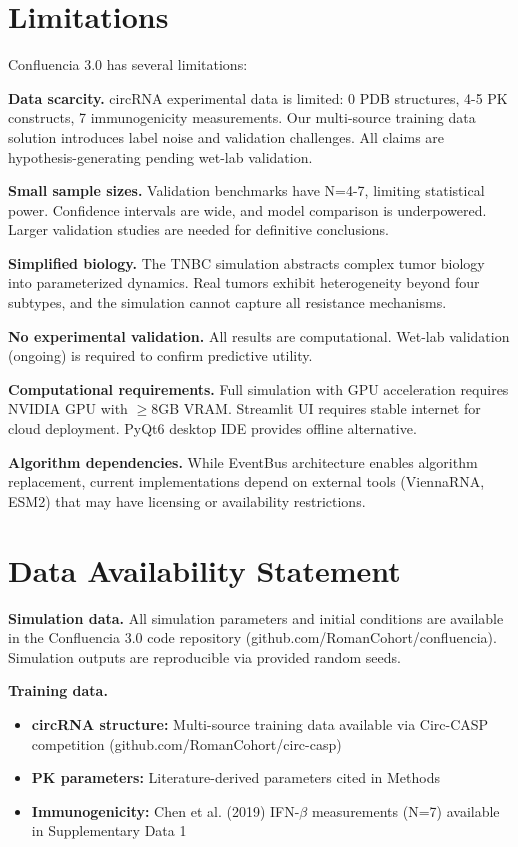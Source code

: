 \documentclass[12pt]{article}
\begin{document}
\section{Limitations}

Confluencia 3.0 has several limitations:

\textbf{Data scarcity.} circRNA experimental data is limited: 0 PDB structures, 4-5 PK constructs, 7 immunogenicity measurements. Our multi-source training data solution introduces label noise and validation challenges. All claims are hypothesis-generating pending wet-lab validation.

\textbf{Small sample sizes.} Validation benchmarks have N=4-7, limiting statistical power. Confidence intervals are wide, and model comparison is underpowered. Larger validation studies are needed for definitive conclusions.

\textbf{Simplified biology.} The TNBC simulation abstracts complex tumor biology into parameterized dynamics. Real tumors exhibit heterogeneity beyond four subtypes, and the simulation cannot capture all resistance mechanisms.

\textbf{No experimental validation.} All results are computational. Wet-lab validation (ongoing) is required to confirm predictive utility.

\textbf{Computational requirements.} Full simulation with GPU acceleration requires NVIDIA GPU with $\geq$8GB VRAM. Streamlit UI requires stable internet for cloud deployment. PyQt6 desktop IDE provides offline alternative.

\textbf{Algorithm dependencies.} While EventBus architecture enables algorithm replacement, current implementations depend on external tools (ViennaRNA, ESM2) that may have licensing or availability restrictions.

\section{Data Availability Statement}

\textbf{Simulation data.} All simulation parameters and initial conditions are available in the Confluencia 3.0 code repository (github.com/RomanCohort/confluencia). Simulation outputs are reproducible via provided random seeds.

\textbf{Training data.}
\begin{itemize}
\item \textbf{circRNA structure:} Multi-source training data available via Circ-CASP competition (github.com/RomanCohort/circ-casp)
\item \textbf{PK parameters:} Literature-derived parameters cited in Methods
\item \textbf{Immunogenicity:} Chen et al. (2019) IFN-$\beta$ measurements (N=7) available in Supplementary Data 1
\end{itemize}
\end{document}
